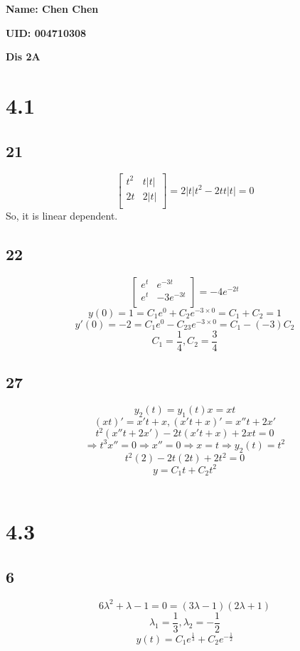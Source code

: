 \documentclass[12pt, a4paper]{IEEEtran}
\begin{document}
    \centerline{\textbf{Name: Chen Chen}}
    \centerline{\textbf{UID: 004710308}}
    \centerline{\textbf{Dis 2A}}

    \section*{4.1}
    \subsection*{21}
    $$\left[
        \begin{matrix}
            t^2&t|t|\\
            2t&2|t|\\
        \end{matrix}
        \right]
    =2|t|t^2-2tt|t|=0$$
    So, it is linear dependent.

    \subsection*{22}
    
    $$\left[
        \begin{matrix}
            e^t&e^{-3t}\\
            e^t&-3e^{-3t}\\
        \end{matrix}
        \right]
    =-4e^{-2t}$$
    $$y(0)=1=C_1e^0+C_2e^{-3\times 0}=C_1+C_2=1$$
    $$y'(0)=-2=C_1e^0-C_23e^{-3\times 0}=C_1-(-3)C_2$$
    $$C_1=\frac{1}{4}, C_2=\frac{3}{4}$$

    \subsection*{27}
    $$y_2(t)=y_1(t)x=xt$$
    $$(xt)'=x't+x, (x't+x)'=x''t+2x'$$
    $$t^2(x''t+2x')-2t(x't+x)+2xt=0$$
    $$\Rightarrow t^3x''=0 \Rightarrow x''=0\Rightarrow x=t\Rightarrow y_2(t)=t^2$$
    $$t^2(2)-2t(2t)+2t^2=0$$
    $$y=C_1t+C_2t^2$$\\
    

    \section*{4.3}

    \subsection*{6}
    $$6\lambda^2+\lambda-1=0= (3\lambda-1)(2\lambda+1)$$
    $$\lambda_1=\frac{1}{3}, \lambda_2=-\frac{1}{2}$$
    $$y(t)=C_1e^{\frac{1}{3}}+C_2e^{-\frac{1}{2}}$$
\end{document}
